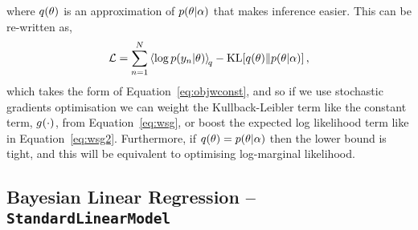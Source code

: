 \documentclass[11pt, oneside]{article}
\begin{document}
where $q\!\left({\theta}\right)$ is an approximation of $p\!\left({\theta}\middle\vert{\ensuremath{\alpha}}\right)$ that 
makes inference easier. This can be re-written as,
\begin{equation}
    \elbo = \sum^N_{n=1} \expec{q}{\log\probC{\targs_n}{\param}} -
    \KL{\qrob{\param}}{\probC{\param}{\hyper}},
    \label{eq:elbo}
\end{equation}
which takes the form of Equation~\eqref{eq:objwconst}, and so if we use
stochastic gradients optimisation we can weight the Kullback-Leibler term like
the constant term, ${g}_{}\!\left({{\cdot}}\right)$, from Equation~\eqref{eq:wsg}, or boost
the expected log likelihood term like in Equation~\eqref{eq:wsg2}.
Furthermore, if $q\!\left({\theta}\right) = p\!\left({\theta}\middle\vert{\ensuremath{\alpha}}\right)$ then the lower bound
is tight, and this will be equivalent to optimising log-marginal likelihood.


\subsection{Bayesian Linear Regression -- \texttt{StandardLinearModel}}
\end{document}

